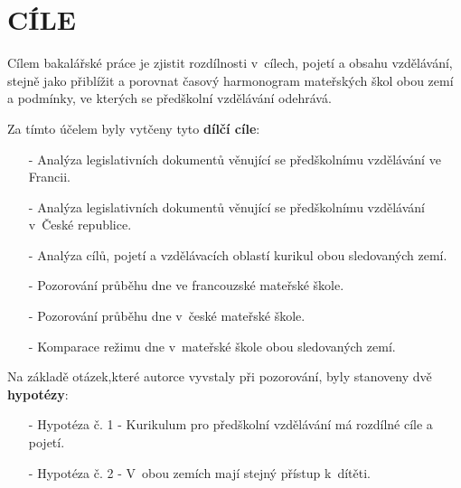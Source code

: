\chapter{CÍLE}

Cílem bakalářské práce je zjistit rozdílnosti v~cílech, pojetí a obsahu vzdělávání, stejně jako přiblížit a porovnat časový harmonogram mateřských škol obou zemí a podmínky, ve kterých se předškolní vzdělávání odehrává. 

Za tímto účelem byly vytčeny tyto \textbf{dílčí cíle}:

\begin{itemize}
	\setlength\itemsep{-2mm}
	\item [-] Analýza legislativních dokumentů věnující se předškolnímu vzdělávání ve Francii.
	\item [-] Analýza legislativních dokumentů věnující se předškolnímu vzdělávání v~České republice.
	\item [-] Analýza cílů, pojetí a vzdělávacích oblastí kurikul obou sledovaných zemí.
	\item [-] Pozorování průběhu dne ve francouzské mateřské škole.
	\item [-] Pozorování průběhu dne v~české mateřské škole. 
	\item [-] Komparace režimu dne v~mateřské škole obou sledovaných zemí.
\end{itemize}


Na základě otázek,které autorce vyvstaly při pozorování, byly stanoveny dvě \textbf{hypotézy}:

\begin{itemize}
\item[-] Hypotéza č. 1 - Kurikulum pro předškolní vzdělávání má rozdílné cíle a pojetí.
\item[-] Hypotéza č. 2 - V~obou zemích mají stejný přístup k~dítěti. 
\end{itemize}
